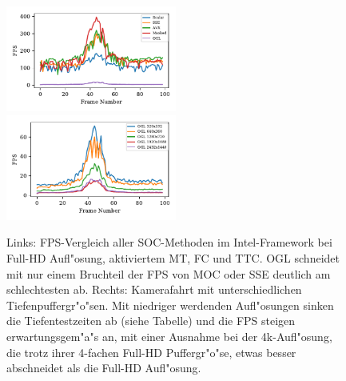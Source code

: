 \documentclass[journal]{vgtc}
\begin{document}
\begin{figure}
	\begin{minipage}{\textwidth}
		\includegraphics[width=0.5\textwidth]{images/Evaluation_1_Results_FPS.pdf}
		\includegraphics[width=0.5\textwidth]{images/Evaluation_4_Results_FPS.pdf}
	\end{minipage}
	\begin{minipage}{\textwidth}
		\centering
	\end{minipage}
	\caption{Links: FPS-Vergleich aller SOC-Methoden im Intel-Framework bei Full-HD Aufl"osung, aktiviertem MT, FC und TTC. OGL schneidet mit nur einem Bruchteil der FPS von MOC oder SSE deutlich am schlechtesten ab. Rechts: Kamerafahrt mit unterschiedlichen Tiefenpuffergr"o"sen. Mit niedriger werdenden Aufl"osungen sinken die Tiefentestzeiten ab (siehe Tabelle) und die FPS steigen erwartungsgem"a"s an, mit einer Ausnahme bei der 4k-Aufl"osung, die trotz ihrer 4-fachen Full-HD Puffergr"o"se, etwas besser abschneidet als die Full-HD Aufl"osung.}
	\label{fig:resolution_fps}
\end{figure}
\end{document}
